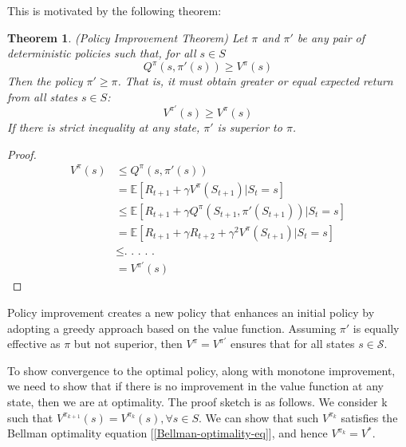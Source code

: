 \documentclass[a4paper,11pt]{report}
\theoremstyle{definition}
\theoremstyle{plain}
\newtheorem{theorem}{Theorem}[section]
\theoremstyle{remark}  %
\begin{document}
This is motivated by the following theorem:
\begin{theorem}
    (Policy Improvement Theorem) Let $\pi$ and $\pi'$ be any pair of deterministic policies such that, 
    for all $s \in S$ 
    $$Q^\pi(s, \pi'(s)) \geq V^\pi(s)$$
    Then the policy $\pi' \geq \pi$. That is, it must obtain greater 
    or equal expected return from all states $s \in S$:
    $$V^{\pi'}(s) \geq V^\pi(s)$$
    If there is strict inequality at any state, $\pi'$ is superior to $\pi$.
\end{theorem}
\begin{proof}
    \begin{align}
        V^{\pi}(s) &\leq Q^{\pi}(s, \pi'(s)) \nonumber \\
        &= \mathbb{E}\left[R_{t+1} + \gamma V^{\pi}(S_{t+1}) | S_t = s\right] \nonumber \\
        &\leq \mathbb{E}\left[R_{t+1} +\gamma Q^{\pi}(S_{t+1}, \pi'(S_{t+1})) | S_t = s\right] \nonumber \\
        &= \mathbb{E}\left[R_{t+1} + \gamma R_{t+2} + \gamma ^2 V^{\pi}(S_{t+1}) | S_t = s\right] \nonumber \\
        &\leq \text{. . . . .} \nonumber \\
        &=V^{\pi'}(s) \nonumber
    \end{align}
\end{proof}


Policy improvement creates a new policy that enhances an initial policy by adopting a greedy approach 
based on the value function. Assuming $\pi'$ is equally effective as $\pi$ but not superior, then 
$V^\pi = V^{\pi'}$ ensures that for all states $s \in \mathcal{S}$.


To show convergence to the optimal policy, along with monotone
improvement, we need to show that if there is no improvement in the value function at any state, then we
are at optimality. The proof sketch is as follows. We consider k such that 
$V^{\pi_{k+1}} (s) = V^{\pi_{k}}(s), \forall s \in S$. 
We can show that such $V^{\pi_{k}}$ satisfies the Bellman optimality equation [\ref{Bellman-optimality-eq}], 
and hence $V^{\pi_{k}} = V^*$.
\end{document}
